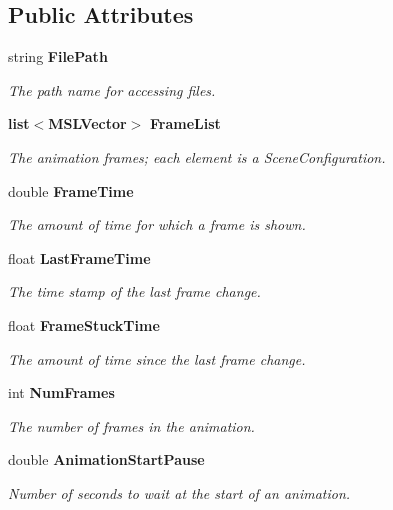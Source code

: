 \subsection*{Public Attributes}
\begin{CompactItemize}
\item 
string {\bf File\-Path}
\begin{CompactList}\small\item\em The path name for accessing files.\item\end{CompactList}\item 
{\bf list}$<${\bf MSLVector}$>$ {\bf Frame\-List}
\begin{CompactList}\small\item\em The animation frames; each element is a Scene\-Configuration.\item\end{CompactList}\item 
double {\bf Frame\-Time}
\begin{CompactList}\small\item\em The amount of time for which a frame is shown.\item\end{CompactList}\item 
float {\bf Last\-Frame\-Time}
\begin{CompactList}\small\item\em The time stamp of the last frame change.\item\end{CompactList}\item 
float {\bf Frame\-Stuck\-Time}
\begin{CompactList}\small\item\em The amount of time since the last frame change.\item\end{CompactList}\item 
int {\bf Num\-Frames}
\begin{CompactList}\small\item\em The number of frames in the animation.\item\end{CompactList}\item 
double {\bf Animation\-Start\-Pause}
\begin{CompactList}\small\item\em Number of seconds to wait at the start of an animation.\item\end{CompactList}\item 

\end{CompactItemize}
